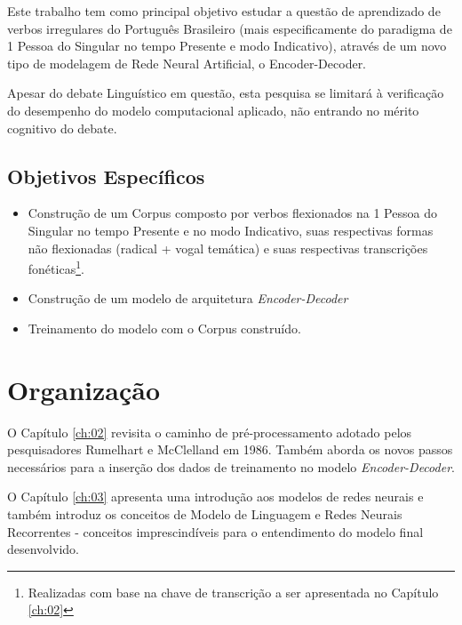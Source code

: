 Este trabalho tem como principal objetivo estudar a questão de aprendizado de verbos irregulares do Português Brasileiro (mais especificamente do paradigma de 1 Pessoa do Singular no tempo Presente e modo Indicativo), através de um novo tipo de modelagem de Rede Neural Artificial, o Encoder-Decoder. 

Apesar do debate Linguístico em questão, esta pesquisa se limitará à verificação do desempenho do modelo computacional aplicado, não entrando no mérito cognitivo do debate.


\subsection{Objetivos Específicos}

\begin{itemize}
    \item Construção de um Corpus composto por verbos flexionados na 1 Pessoa do Singular no tempo Presente e no modo Indicativo, suas respectivas formas não flexionadas (radical + vogal temática) e suas respectivas transcrições fonéticas\footnote{Realizadas com base na chave de transcrição a ser apresentada no Capítulo \ref{ch:02}}.
    \item Construção de um modelo de arquitetura \textit{Encoder-Decoder}
    \item Treinamento do modelo com o Corpus construído.
\end{itemize}



\section{Organização}
\label{sec:organization}

O Capítulo \ref{ch:02} revisita o caminho de pré-processamento adotado pelos pesquisadores Rumelhart e McClelland em 1986. Também aborda os novos passos necessários para a inserção dos dados de treinamento no modelo \textit{Encoder-Decoder}. 

O Capítulo \ref{ch:03} apresenta uma introdução aos modelos de redes neurais e também introduz os conceitos de Modelo de Linguagem e Redes Neurais Recorrentes - conceitos imprescindíveis para o entendimento do modelo final desenvolvido.

